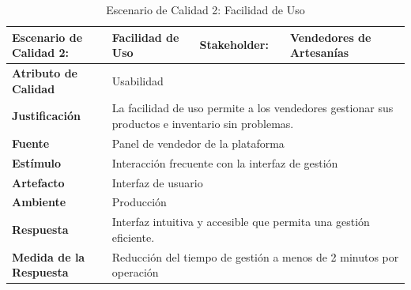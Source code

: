 \documentclass[12pt]{article}
\begin{document}
\begin{table}[H]
    \centering
    \begin{tabular}{|p{5cm}|p{3cm}|p{4cm}|p{4cm}|}
        \hline
        \multicolumn{1}{|p{5cm}|}{\cellcolor{teal!50}\textbf{Escenario de Calidad 2:}} & \multicolumn{1}{p{3cm}|}{Facilidad de Uso} & \multicolumn{1}{l|}{\cellcolor{teal!50}\textbf{Stakeholder:}} & \multicolumn{1}{p{4cm}|}{Vendedores de Artesanías} \\ \hline
        \multicolumn{1}{|p{5cm}|}{\cellcolor{teal!50}\textbf{Atributo de Calidad}}    & \multicolumn{3}{p{11cm}|}{Usabilidad} \\ \hline
        \multicolumn{1}{|p{5cm}|}{\cellcolor{teal!50}\textbf{Justificación}}           & \multicolumn{3}{p{11cm}|}{La facilidad de uso permite a los vendedores gestionar sus productos e inventario sin problemas.} \\ \hline
        \multicolumn{1}{|p{5cm}|}{\cellcolor{teal!50}\textbf{Fuente}}                  & \multicolumn{3}{p{11cm}|}{Panel de vendedor de la plataforma} \\ \hline
        \multicolumn{1}{|p{5cm}|}{\cellcolor{teal!50}\textbf{Estímulo}}                & \multicolumn{3}{p{11cm}|}{Interacción frecuente con la interfaz de gestión} \\ \hline
        \multicolumn{1}{|p{5cm}|}{\cellcolor{teal!50}\textbf{Artefacto}}               & \multicolumn{3}{p{11cm}|}{Interfaz de usuario} \\ \hline
        \multicolumn{1}{|p{5cm}|}{\cellcolor{teal!50}\textbf{Ambiente}}                & \multicolumn{3}{p{11cm}|}{Producción} \\ \hline
        \multicolumn{1}{|p{5cm}|}{\cellcolor{teal!50}\textbf{Respuesta}}               & \multicolumn{3}{p{11cm}|}{Interfaz intuitiva y accesible que permita una gestión eficiente.} \\ \hline
        \multicolumn{1}{|p{5cm}|}{\cellcolor{teal!50}\textbf{Medida de la Respuesta}}  & \multicolumn{3}{p{11cm}|}{Reducción del tiempo de gestión a menos de 2 minutos por operación} \\ \hline
    \end{tabular}
    \caption{Escenario de Calidad 2: Facilidad de Uso}
    \label{tab:escenarios_calidad_2}
\end{table}
\end{document}

